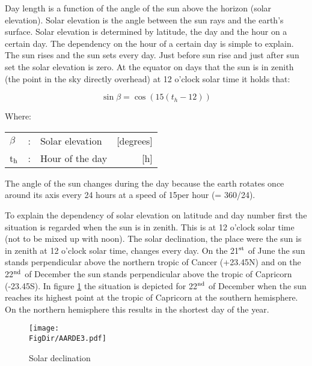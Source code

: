 Day length is a function of the angle of the sun above the horizon (solar elevation). Solar
elevation is the angle between the sun rays and the earth's surface. Solar elevation is
determined by latitude, the day and the hour on a certain day.
The dependency on the hour of a certain day is simple to explain. The sun rises and the
sun sets every day. Just before sun rise and just after sun set the solar elevation is zero. At the equator on days that the sun is in zenith (the point in the sky directly overhead) at 12 o'clock solar time it holds that:

\begin{equation}
\sin \beta = \cos (15(t _{h} -12))
\end{equation}

Where:\\[5pt]
\begin{tabularx}{\textwidth}{llXr}
$\beta$ &:& Solar elevation  & [degrees]\\
t$_{{\rm h}}$ &:& Hour of the day  & [h]\\
\end{tabularx}

The angle of the sun changes during the day because the earth rotates once around its axis
every 24 hours at a speed of 15\degrees per hour (= 360/24).  

To explain the dependency of solar elevation on latitude and day number first the situation
is regarded when the sun is in zenith. This is at 12 o'clock solar time (not to be mixed up
with noon). The solar declination, the place were the sun is in zenith at 12 o'clock solar
time, changes every day. On the 21$^{\rm st}$ of June the sun stands perpen\-dicular above the northern tropic of Cancer (+23.45\degrees N) and on the 22$^{\rm nd}$ of December the sun stands perpendicular above the tropic of Capricorn (-23.45\degrees S). In figure \ref{fig:solardecl} the situation is depicted for 22$^{\rm nd}$ of December when the sun reaches its highest point at the tropic of Capricorn at the southern hemisphere. On the northern hemisphere this results in the shortest day of the year.

\begin{figure}[p]
\centering
\texttt{[image: \\FigDir/AARDE3.pdf]}
\caption{Solar declination}
\label{fig:solardecl}
\end{figure}

